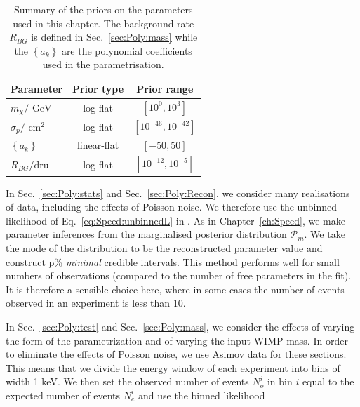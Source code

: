 \begin{table}[t]
  \setlength{\extrarowheight}{2pt}
  \setlength{\tabcolsep}{3pt}
  \begin{center}
	\begin{tabular}{m{1in}|cc}
        \hline\hline
	Parameter & Prior type & Prior range\\
	\hline
	$m_\chi / \textrm{ GeV}$ &  log-flat & $\left[10^{0}, 10^{3}\right]$\\
	$\sigma_p / \textrm{ cm}^2$ & log-flat & $\left[10^{-46}, 10^{-42}\right]$ \\
	$\left\{a_k\right\}$ & linear-flat & $\left[-50, 50\right]$ \\
        $R_{BG} / \textrm{dru}$ & log-flat & $\left[10^{-12}, 10^{-5}\right]$ \\
        \hline\hline
	\end{tabular}
  \end{center}
\caption[Summary of the priors on the parameters used in Chapter \ref{ch:Poly}]{Summary of the priors on the parameters used in this chapter. The background rate $R_{BG}$ is defined in Sec.~\ref{sec:Poly:mass} while the $\left\{a_k\right\}$ are the polynomial coefficients used in the parametrisation.}
\label{tab:Poly:priors}
\end{table}


In Sec.~\ref{sec:Poly:stats} and Sec.~\ref{sec:Poly:Recon}, we consider many realisations of data, including the effects of Poisson noise. We therefore use the unbinned likelihood of Eq.~\ref{eq:Speed:unbinnedL} in \multinest. As in Chapter~\ref{ch:Speed}, we make parameter inferences from the marginalised posterior distribution $\mathcal{P}_m$. We take the mode of the distribution to be the reconstructed parameter value and construct p\% \textit{minimal} credible intervals. This method performs well for small numbers of observations (compared to the number of free parameters in the fit). It is therefore a sensible choice here, where in some cases the number of events observed in an experiment is less than 10.

In Sec.~\ref{sec:Poly:test} and Sec.~\ref{sec:Poly:mass}, we consider the effects of varying the form of the parametrization and of varying the input WIMP mass. In order to eliminate the effects of Poisson noise, we use Asimov data \cite{Cowan:2013} for these sections. This means that we divide the energy window of each experiment into bins of width 1 keV. We then set the observed number of events $N_{o}^{i}$ in bin $i$ equal to the expected number of events $N_{e}^{i}$ and use the binned likelihood

